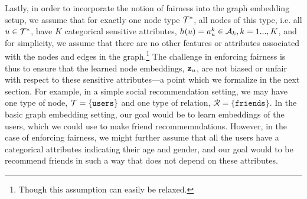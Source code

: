 Lastly, in order to incorporate the notion of fairness into the graph embedding setup, we assume that for exactly one node type $\mathcal{T}^*$, all nodes of this type, i.e. all $u \in \mathcal{T}^*$, have $K$ categorical sensitive attributes, $h(u) = a^k_u \in \mathcal{A}_k, k=1...,K$, and for simplicity, we assume that there are no other features or attributes associated with the nodes and edges in the graph.\footnote{Though this assumption can easily be relaxed.}
The challenge in enforcing fairness is thus to ensure that the learned node embeddings, $\mathbf{z}_u$, are not biased or unfair with respect to these sensitive attributes---a point which we formalize in the next section. 
For example, in a simple social recommendation setting, we may have one type of node, $\mathcal{T} = \{\texttt{users}\}$ and one type of relation, $\mathcal{R} = \{\texttt{friends}\}$.
In the basic graph embedding setting, our goal would be to learn embeddings of the users, which we could use to make friend recommemndations. 
However, in the case of enforcing fairness, we might further assume that all the users have a categorical attributes indicating their age and gender, and our goal would to be recommend friends in such a way that does not depend on these attributes. 
